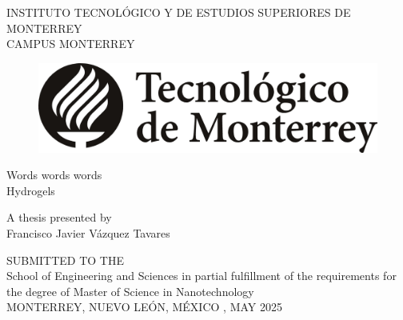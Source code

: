 




\pagestyle{empty} %

\begin{center}
\Large { INSTITUTO TECNOL\'{O}GICO Y DE ESTUDIOS SUPERIORES DE MONTERREY\\}
\normalsize { CAMPUS MONTERREY } \\
\vspace*{1 cm}

\begin{figure}[!h]
 \begin{center}
  \includegraphics[scale=0.2]{pics/LogoTec.jpg}
 \end{center}
\end{figure}
\vspace*{0.6cm}

\Large {Words words words \\}
\Large {Hydrogels}

\vspace*{1 cm}
\normalsize {A thesis presented by} \\
\vspace*{1 cm}
\Large {Francisco Javier V\'{a}zquez Tavares}\\
\vspace*{1.5cm}
\normalsize

SUBMITTED TO THE \\
School of Engineering and Sciences
in partial fulfillment of the requirements for the degree of
\vspace*{1.5cm}
\Large {Master of Science in Nanotechnology} \\
\normalsize
\vspace*{2.5cm}
MONTERREY, NUEVO LE\'{O}N, M\'{E}XICO , MAY 2025\\
\end{center}

